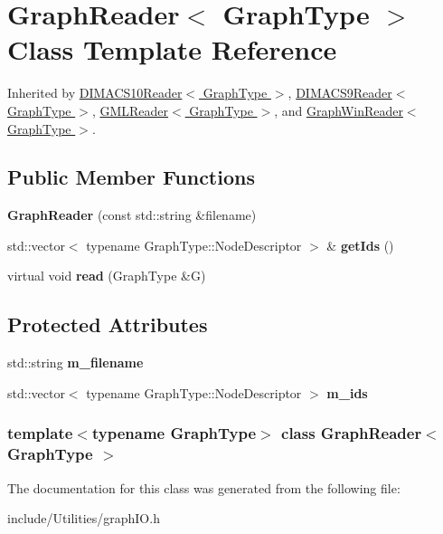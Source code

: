 \hypertarget{class_graph_reader}{
\section{GraphReader$<$ GraphType $>$ Class Template Reference}
\label{class_graph_reader}
}


Inherited by \hyperlink{class_d_i_m_a_c_s10_reader}{DIMACS10Reader$<$ GraphType $>$}, \hyperlink{class_d_i_m_a_c_s9_reader}{DIMACS9Reader$<$ GraphType $>$}, \hyperlink{class_g_m_l_reader}{GMLReader$<$ GraphType $>$}, and \hyperlink{class_graph_win_reader}{GraphWinReader$<$ GraphType $>$}.

\subsection*{Public Member Functions}
\begin{DoxyCompactItemize}
\item 
\hypertarget{class_graph_reader_aa72e71cf224766054fc0056622790560}{
{\bfseries GraphReader} (const std::string \&filename)}
\label{class_graph_reader_aa72e71cf224766054fc0056622790560}

\item 
\hypertarget{class_graph_reader_a73c0f300806ef69abe51dfea82c48a7b}{
std::vector$<$ typename GraphType::NodeDescriptor $>$ \& {\bfseries getIds} ()}
\label{class_graph_reader_a73c0f300806ef69abe51dfea82c48a7b}

\item 
\hypertarget{class_graph_reader_a10e0580d6786c0a5a9617127a54ce155}{
virtual void {\bfseries read} (GraphType \&G)}
\label{class_graph_reader_a10e0580d6786c0a5a9617127a54ce155}

\end{DoxyCompactItemize}
\subsection*{Protected Attributes}
\begin{DoxyCompactItemize}
\item 
\hypertarget{class_graph_reader_a4dabeceff4a7825713871fc311555639}{
std::string {\bfseries m\_\-filename}}
\label{class_graph_reader_a4dabeceff4a7825713871fc311555639}

\item 
\hypertarget{class_graph_reader_ad5fb2f48cc8a38e710f6a6e2ee133fa9}{
std::vector$<$ typename GraphType::NodeDescriptor $>$ {\bfseries m\_\-ids}}
\label{class_graph_reader_ad5fb2f48cc8a38e710f6a6e2ee133fa9}

\end{DoxyCompactItemize}
\subsubsection*{template$<$typename GraphType$>$ class GraphReader$<$ GraphType $>$}



The documentation for this class was generated from the following file:\begin{DoxyCompactItemize}
\item 
include/Utilities/graphIO.h\end{DoxyCompactItemize}
